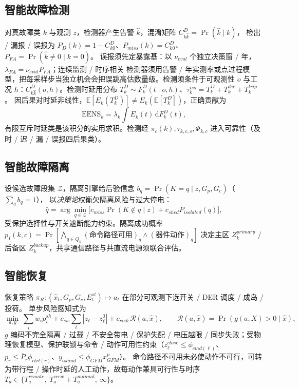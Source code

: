 \subsection{智能故障检测}\label{sec:rel-icp-detect}
对真故障类 $k$ 与观测 $z$，检测器产生告警 $\hat k$，混淆矩阵 $C^D_{k\hat k}=\Pr(\hat k\mid k)$，
检出 / 漏报 / 误报为 $P_D(k)=1-C^D_{k0}$、$P_{miss}(k)=C^D_{k0}$、$P_{FA}=\Pr(\hat k\ne0\mid k{=}0)$。
误报须先定暴露基：以 $\nu_{eval}$ 个独立决策窗 / 年，$\lambda_{FA}=\nu_{eval}P_{FA}$；连续监测 / 时序相关
检测器须用告警 / 年实测率或点过程模型，把每采样步当独立机会会把误跳高估数量级。检测须条件于可观测性 $o$
与工况 $h$：$C^D_{k\hat k}(o,h)$。检测时延用分布 $T_k^D\sim F_k^D(t\mid o,h)$、$\tau_k^{iso}=T_k^D+T_k^{dec}+T_k^{trip}$。
因后果对时延非线性，$\mathbb E[E_k(T_k^D)]\ne E_k(\mathbb E[T_k^D])$，正确贡献为
\begin{equation}
 \mathrm{EENS}_k=\lambda_k\int E_k(t)\,\mathrm dF_k^D(t),
\end{equation}
有限互斥时延类是该积分的实用求积。检测经 $\pi_c(k),\tau_{k,c,s},\Phi_{k,c}$ 进入可靠性（及时 / 迟 / 漏 /
误报四后果类）。

\subsection{智能故障隔离}\label{sec:rel-icp-isolate}
设候选故障段集 $\mathcal Z$，隔离引擎给后验信念 $b_q=\Pr(K{=}q\mid z,G_p,G_c)$（$\sum_qb_q=1$），
以\emph{决策论}权衡欠隔离风险与过大停电：
\begin{equation}
 \hat q=\arg\min_{q\in\mathcal Z}\big[c_{miss}\Pr(K\notin q\mid z)+c_{shed}P_{isolated}(q)\big],
\end{equation}
受保护选择性与开关遮断能力约束。隔离成功概率 $p_I(k,c)=\Pr[\bigwedge_{q\in Q_k}(\text{命令路径可用})_q\land
(\text{器件动作})_q]$ 决定主区 $Z_k^{primary}$ / 后备区 $Z_k^{backup}$，共享通信路径与共直流电源须联合评估。

\subsection{智能恢复}\label{sec:rel-icp-restore}
恢复策略 $\pi_R:(\hat x_t,G_p,G_c,E_t^{st})\mapsto a_t$ 在部分可观测下选开关 / DER 调度 / 成岛 / 投荷。
单步风险感知式为
\begin{equation}
 \min_{a,y}\ \sum_iw_ip_i^{sh}+c_{sw}\sum_\ell|z_\ell-z_\ell^0|+c_{risk}\,\mathcal R(a,\hat x),\qquad
 \mathcal R(a,\hat x)=\Pr(g(a,X)>0\mid\hat x),
\end{equation}
$g$ 编码不完全隔离 / 过载 / 不安全带电 / 保护失配 / 电压越限 / 同步失败；受物理恢复模型、保护联锁与命令 /
动作可用性约束（$z_\ell^{close}\le\phi_{cmd(\ell)}$、$p_r\le\overline P_r\phi_{ctrl(r)}$、$y_{island}\le\phi_{GFM}x_{GFM}^p$）。
命令路径不可用未必使动作不可行，可转为带行程 / 操作时延的人工动作，故每动作兼具可行性与时序
$T_a\in\{T_a^{remote},\ T_a^{crew}+T_a^{manual},\ \infty\}$。

